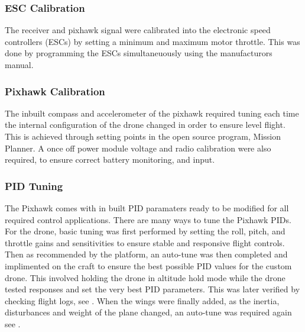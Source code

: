 \subsubsection*{ESC Calibration}
The receiver and pixhawk signal were calibrated into the electronic speed controllers (ESCs) by setting a minimum and maximum motor throttle. This was done by programming the ESCs simultaneuously using the manufacturors manual.

\subsubsection*{Pixhawk Calibration}
The inbuilt compass and accelerometer of the pixhawk required tuning each time the internal configuration of the drone changed in order to ensure level flight. This is achieved through setting points in the open source program, Mission Planner. A once off power module voltage and radio calibration were also required, to ensure correct battery monitoring, and input. 

\subsubsection*{PID Tuning}
The Pixhawk comes with in built PID paramaters ready to be modified for all required control applications.  There are many ways to tune the Pixhawk PIDs. For the drone, basic tuning was first performed by setting the roll, pitch, and throttle gains and sensitivities to ensure stable and responsive flight controls. Then as recommended by the platform, an auto-tune was then completed and implimented on the craft to ensure the best possible PID values for the custom drone. This involved holding the drone in altitude hold mode while the drone tested responses and set the very best PID parameters. This was later verified by checking flight logs, see . When the wings were finally added, as the inertia, disturbances and weight of the plane changed, an auto-tune was required again see .


